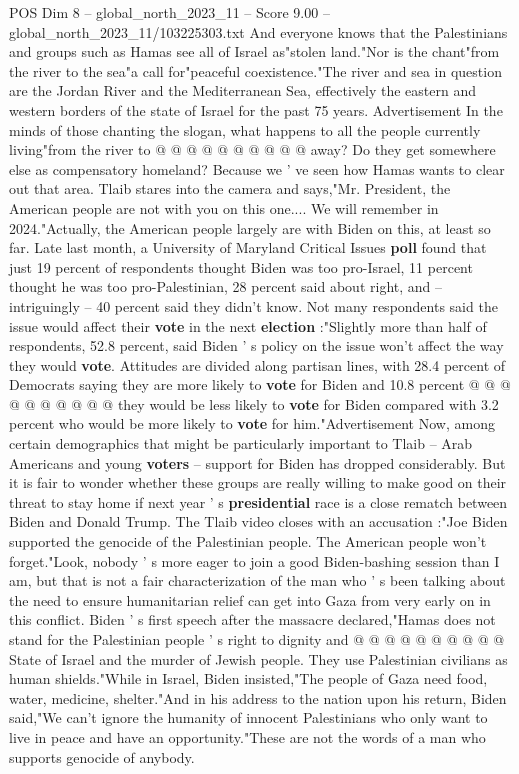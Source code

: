 \begin{textsample}{POS Dim 8 – global\_north\_2023\_11 – Score 9.00 – global\_north\_2023\_11/103225303.txt}
And everyone knows that the Palestinians and groups such as Hamas see all of Israel as"stolen land."Nor is the chant"from the river to the sea"a call for"peaceful coexistence."The river and sea in question are the Jordan River and the Mediterranean Sea, effectively the eastern and western borders of the state of Israel for the past 75 years.
Advertisement In the minds of those chanting the slogan, what happens to all the people currently living"from the river to @ @ @ @ @ @ @ @ @ @ away?
Do they get somewhere else as compensatory homeland?
Because we ' ve seen how Hamas wants to clear out that area.
Tlaib stares into the camera and says,"Mr.
President, the American people are not with you on this one....
We will remember in 2024."Actually, the American people largely are with Biden on this, at least so far.
Late last month, a University of Maryland Critical Issues \textbf{poll} found that just 19 percent of respondents thought Biden was too pro-Israel, 11 percent thought he was too pro-Palestinian, 28 percent said about right, and -- intriguingly -- 40 percent said they didn't know.
Not many respondents said the issue would affect their \textbf{vote} in the next \textbf{election} :"Slightly more than half of respondents, 52.8 percent, said Biden ' s policy on the issue won't affect the way they would \textbf{vote}.
Attitudes are divided along partisan lines, with 28.4 percent of Democrats saying they are more likely to \textbf{vote} for Biden and 10.8 percent @ @ @ @ @ @ @ @ @ @ they would be less likely to \textbf{vote} for Biden compared with 3.2 percent who would be more likely to \textbf{vote} for him."Advertisement Now, among certain demographics that might be particularly important to Tlaib -- Arab Americans and young \textbf{voters} -- support for Biden has dropped considerably.
But it is fair to wonder whether these groups are really willing to make good on their threat to stay home if next year ' s \textbf{presidential} race is a close rematch between Biden and Donald Trump.
The Tlaib video closes with an accusation :"Joe Biden supported the genocide of the Palestinian people.
The American people won't forget."Look, nobody ' s more eager to join a good Biden-bashing session than I am, but that is not a fair characterization of the man who ' s been talking about the need to ensure humanitarian relief can get into Gaza from very early on in this conflict.
Biden ' s first speech after the massacre declared,"Hamas does not stand for the Palestinian people ' s right to dignity and @ @ @ @ @ @ @ @ @ @ State of Israel and the murder of Jewish people.
They use Palestinian civilians as human shields."While in Israel, Biden insisted,"The people of Gaza need food, water, medicine, shelter."And in his address to the nation upon his return, Biden said,"We can't ignore the humanity of innocent Palestinians who only want to live in peace and have an opportunity."These are not the words of a man who supports genocide of anybody.

\end{textsample}
